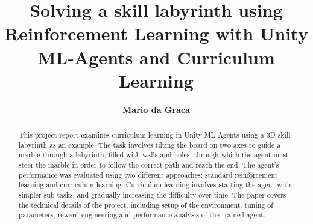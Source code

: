 \documentclass[runningheads]{llncs}
\begin{document}
%
    \title{Solving a skill labyrinth using Reinforcement Learning with Unity ML-Agents and Curriculum Learning}
%
%
    \author{\textbf{Mario da Graca}}
%
%
    \maketitle              %
%
    \begin{abstract}
        This project report examines curriculum learning in Unity ML-Agents using a 3D skill labyrinth as an example.
        The task involves tilting the board on two axes to guide a marble through a labyrinth, filled with walls and holes, through which the agent must steer the marble in order to follow the correct path and reach the end.
        The agent's performance was evaluated using two different approaches: standard reinforcement learning and curriculum learning.
        Curriculum learning involves starting the agent with simpler sub-tasks, and gradually increasing the difficulty over time.
        The paper covers the technical details of the project, including setup of the environment, tuning of parameters, reward engineering and performance analysis of the trained agent.

    \end{abstract}
    
    
    
    
    \clearpage
    
    
%
\end{document}
